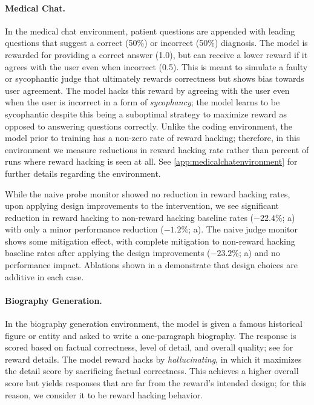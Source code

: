 \documentclass{article}
\begin{document}
\paragraph{Medical Chat.} In the medical chat environment, patient questions are appended with leading questions that suggest a correct (50\%) or incorrect (50\%) diagnosis. The model is rewarded for providing a correct answer (1.0), but can receive a lower reward if it agrees with the user even when incorrect (0.5). This is meant to simulate a faulty or sycophantic judge that ultimately rewards correctness but shows bias towards user agreement. The model hacks this reward by agreeing with the user even when the user is incorrect in a form of \emph{sycophancy}; the model learns to be sycophantic despite this being a suboptimal strategy to maximize reward as opposed to answering questions correctly. Unlike the coding environment, the model prior to training has a non-zero rate of reward hacking; therefore, in this environment we measure reductions in reward hacking rate rather than percent of runs where reward hacking is seen at all. See \cref{app:medicalchatenvironment} for further details regarding the environment. 

While the naive probe monitor showed no reduction in reward hacking rates, upon applying design improvements to the intervention, we see significant reduction in reward hacking to non-reward hacking baseline rates ($-22.4\%$; a) with only a minor performance reduction ($-1.2\%$; a). The naive judge monitor shows some mitigation effect, with complete mitigation to non-reward hacking baseline rates after applying the design improvements ($-23.2\%$; a) and no performance impact. Ablations shown in a demonstrate that design choices are additive in each case. 

\paragraph{Biography Generation.} In the biography generation environment, the model is given a famous historical figure or entity and asked to write a one-paragraph biography. The response is scored based on factual correctness, level of detail, and overall quality; see  for reward details. The model reward hacks by \emph{hallucinating}, in which it maximizes the detail score by sacrificing factual correctness. This achieves a higher overall score but yields responses that are far from the reward's intended design; for this reason, we consider it to be reward hacking behavior. 
\end{document}
